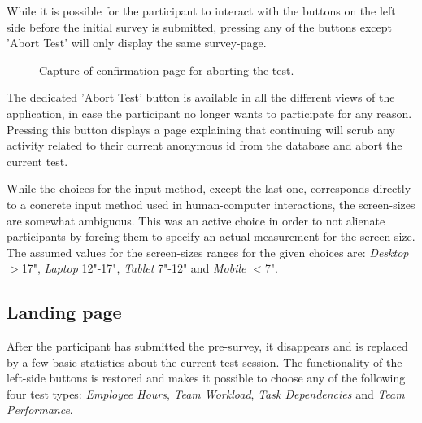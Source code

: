 {  While it is possible for the participant to interact with the buttons on
  the left side before the initial survey is submitted, pressing any of the
  buttons except 'Abort Test' will only display the same survey-page.

  \vspace{-0.4cm}
  \begin{figure}[h!]
    \centering
    \vspace{-0.2cm}
    \caption{Capture of confirmation page for aborting the test.}
    \label{label_abort}
  \end{figure}

  \vspace{-0.2cm}
  The dedicated 'Abort Test' button is available in all the different
  views of the application, in case the participant no longer wants to
  participate for any reason. Pressing this button displays a page
  explaining that continuing will scrub any activity related to their
  current anonymous id from the database and abort the current test.

  While the choices for the input method, except the last one, corresponds
  directly to a concrete input method used in human-computer interactions, the
  screen-sizes are somewhat ambiguous. This was an active choice in order to
  not alienate participants by forcing them to specify an actual measurement
  for the screen size. The assumed values for the screen-sizes ranges for the
  given choices are:
  \textit{Desktop} $>$17",
  \textit{Laptop}  12"-17",
  \textit{Tablet}  7"-12" and
  \textit{Mobile}  $<$7".

  \subsection{Landing page}

  \vspace{-0.2cm}
  After the participant has submitted the pre-survey, it  disappears and is
  replaced by a few basic statistics about the current test session.
  The functionality of the left-side buttons is restored and makes it
  possible to choose any of the following four test types:
  \textit{Employee Hours},
  \textit{Team Workload},
  \textit{Task Dependencies} and
  \textit{Team Performance}.

}
